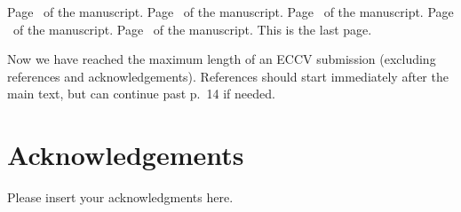 \documentclass[runningheads]{llncs}
\begin{document}
\clearpage\mbox{}Page \thepage\ of the manuscript.
\clearpage\mbox{}Page \thepage\ of the manuscript.
\clearpage\mbox{}Page \thepage\ of the manuscript.
\clearpage\mbox{}Page \thepage\ of the manuscript.
\clearpage\mbox{}Page \thepage\ of the manuscript. This is the last page.
\par\vfill\par
Now we have reached the maximum length of an ECCV \ECCVyear{} submission (excluding references and acknowledgements).
References should start immediately after the main text, but can continue past p.\ 14 if needed. 
\clearpage  %

\section*{Acknowledgements}
Please insert your acknowledgments here.

%
%


\end{document}
